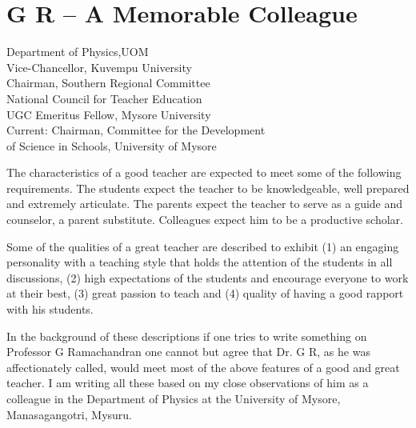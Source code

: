 \chapter[G R – A Memorable Colleague]{G R – A Memorable Colleague}\label{chap12}


\begin{center}
Department of Physics,UOM\\
Vice-Chancellor, Kuvempu University\\
Chairman, Southern Regional Committee \\
National Council for Teacher Education\\
UGC Emeritus Fellow, Mysore University\\
Current: Chairman, Committee for the Development\\
of Science in Schools, University of Mysore\\
\end{center}

The characteristics of a good teacher are expected to meet some of the following requirements. The students expect the teacher to be knowledgeable, well prepared and extremely articulate. The parents expect the teacher to serve as a guide and counselor, a parent substitute. Colleagues expect him to be a productive scholar.

Some of the qualities of a great teacher are described to exhibit (1) an engaging personality with a teaching style that holds the attention of the students in all discussions, (2) high expectations of the students and encourage everyone to work at their best, (3) great  passion to teach and  (4) quality of having a good rapport with his students.

In the background of these descriptions if one tries to write something on Professor G Ramachandran one cannot but agree that Dr. G R, as he was affectionately called, would meet most of the above features of a good and great teacher. I am writing all these based on my close observations of him as a colleague in the Department of Physics at the University of Mysore, Manasagangotri, Mysuru.

